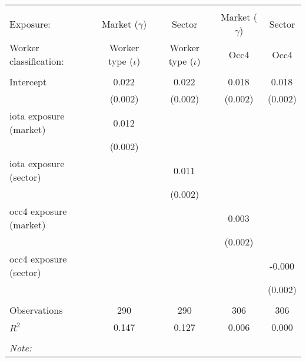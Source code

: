 \begin{tabular}{@{\extracolsep{5pt}}lcccc}
\\[-1.8ex]\hline
\hline \\[-1.8ex]
\hline \\[-1.8ex]
 Exposure: & Market ($\gamma$) & Sector & Market ($\gamma$) & Sector \\
 Worker classification: & Worker type ($\iota$) & Worker type ($\iota$) & Occ4 & Occ4 \\
 \hline &  &  &  &  \\
 Intercept & 0.022$^{}$ & 0.022$^{}$ & 0.018$^{}$ & 0.018$^{}$ \\
  & (0.002) & (0.002) & (0.002) & (0.002) \\
 iota exposure (market) & 0.012$^{}$ & & & \\
  & (0.002) & & & \\
 iota exposure (sector) & & 0.011$^{}$ & & \\
  & & (0.002) & & \\
 occ4 exposure (market) & & & 0.003$^{}$ & \\
  & & & (0.002) & \\
 occ4 exposure (sector) & & & & -0.000$^{}$ \\
  & & & & (0.002) \\
\hline \\[-1.8ex]
 Observations & 290 & 290 & 306 & 306 \\
 $R^2$ & 0.147 & 0.127 & 0.006 & 0.000 \\
\hline
\hline \\[-1.8ex]
\textit{Note:}\end{tabular}